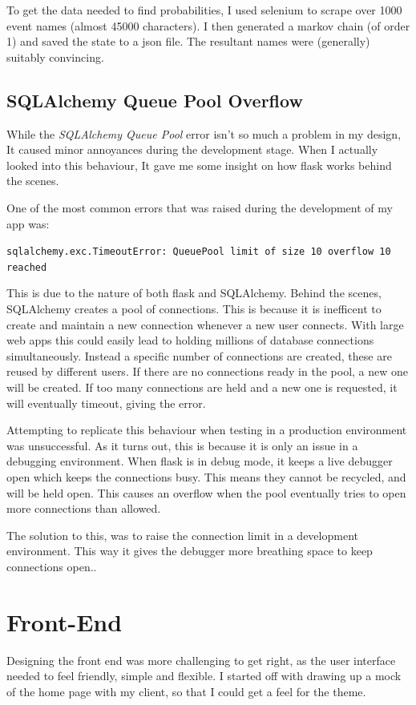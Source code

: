 \documentclass[a4paper,oneside,12pt]{report}
\begin{document}
	To get the data needed to find probabilities, I used selenium to scrape over 1000 event names (almost 45000 characters). I then generated a markov chain (of order 1) and saved the state to a json file. The resultant names were (generally) suitably convincing.

	\subsection{SQLAlchemy Queue Pool Overflow}
	While the \textit{SQLAlchemy Queue Pool} error isn't so much a problem in my design, It caused minor annoyances during the development stage. When I actually looked into this behaviour, It gave me some insight on how flask works behind the scenes. 
	
	One of the most common errors that was raised during the development of my app was:
	\begin{framed}
		\lstinline|sqlalchemy.exc.TimeoutError: QueuePool limit of size 10 overflow 10 reached|
	\end{framed}
	
	This is due to the nature of both flask and SQLAlchemy. Behind the scenes, SQLAlchemy creates a pool of connections. This is because it is inefficent to create and maintain a new connection whenever a new user connects. With large web apps this could easily lead to holding millions of database connections simultaneously. Instead a specific number of connections are created, these are reused by different users. If there are no connections ready in the pool, a new one will be created. If too many connections are held and a new one is requested, it will eventually timeout, giving the error.

	Attempting to replicate this behaviour when testing in a production environment was unsuccessful. As it turns out, this is because it is only an issue in a debugging environment. When flask is in debug mode, it keeps a live debugger open which keeps the connections busy. This means they cannot be recycled, and will be held open. This causes an overflow when the pool eventually tries to open more connections than allowed.

	The solution to this, was to raise the connection limit in a development environment. This way it gives the debugger more breathing space to keep connections open..

	\section{Front-End}
	Designing the front end was more challenging to get right, as the user interface needed to feel friendly, simple and flexible. I started off with drawing up a mock of the home page with my client, so that I could get a feel for the theme.
\end{document}
